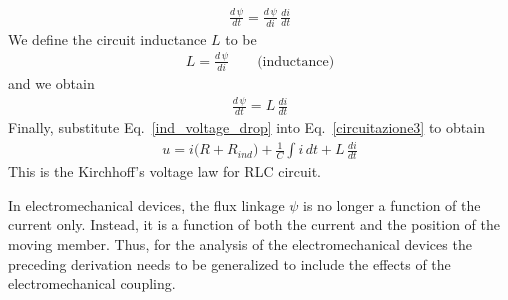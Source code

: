 \documentclass[12pt,a4paper,oneside]{book}
\begin{document}
\begin{onehalfspace}
\begin{equation}\label{}
	\begin{aligned}
		\frac{d\,\psi}{dt} = \frac{d\,\psi}{di}\,\frac{di}{dt}
	\end{aligned}
\end{equation} 
We define the circuit inductance $L$ to be 
\begin{equation}\label{inductance}
	\begin{aligned}
		L = \frac{d\,\psi}{di}\qquad\text{(inductance)}
	\end{aligned}
\end{equation} 
and we obtain 
\begin{equation}\label{ind_voltage_drop}
	\begin{aligned}
		\frac{d\,\psi}{dt} = L\,\frac{di}{dt}
	\end{aligned}
\end{equation} 
Finally, substitute Eq.~\eqref{ind_voltage_drop} into Eq.~\eqref{circuitazione3} to obtain
\begin{equation}\label{circuitazione4}
	\begin{aligned}
		u = i\big(R+R_{ind}\big)+\frac{1}{C}\int i\,dt+L\,\frac{di}{dt}
	\end{aligned}
\end{equation} 
This is the Kirchhoff's voltage law for RLC circuit.

In electromechanical devices, the flux linkage $\psi$ is no longer a function of the current only. Instead, it is a function of both the current and the position of the moving member. Thus, for the analysis of the electromechanical devices the preceding derivation needs to be generalized to include the effects of the electromechanical coupling.


\end{onehalfspace}
\end{document}
